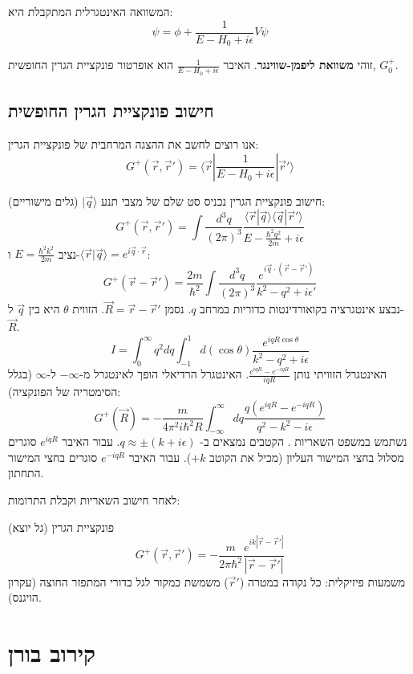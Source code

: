 המשוואה האינטגרלית המתקבלת היא:
$$ \psi = \phi + \frac{1}{E - H_0 + i\epsilon} V \psi $$

זוהי \textbf{משוואת ליפמן-שווינגר}. האיבר $\frac{1}{E - H_0 + i\epsilon}$ הוא אופרטור פונקציית הגרין החופשית, $G_0^+$.

\subsection{חישוב פונקציית הגרין החופשית}
אנו רוצים לחשב את ההצגה המרחבית של פונקציית הגרין:
$$ G^+(\vec{r}, \vec{r}') = \langle \vec{r} | \frac{1}{E - H_0 + i\epsilon} | \vec{r}' \rangle $$

חישוב פונקציית הגרין
נכניס סט שלם של מצבי תנע $|\vec{q}\rangle$ (גלים מישוריים):
$$ G^+(\vec{r}, \vec{r}') = \int \frac{d^3q}{(2\pi)^3} \frac{\langle \vec{r} | \vec{q} \rangle \langle \vec{q} | \vec{r}' \rangle}{E - \frac{\hbar^2 q^2}{2m} + i\epsilon} $$
נציב $E = \frac{\hbar^2 k^2}{2m}$ ו-$\langle \vec{r}|\vec{q}\rangle = e^{i\vec{q}\cdot\vec{r}}$:
$$ G^+(\vec{r} - \vec{r}') = \frac{2m}{\hbar^2} \int \frac{d^3q}{(2\pi)^3} \frac{e^{i\vec{q}\cdot(\vec{r}-\vec{r}')}}{k^2 - q^2 + i\epsilon'} $$
נבצע אינטגרציה בקואורדינטות כדוריות במרחב $q$. נסמן $\vec{R} = \vec{r} - \vec{r}'$. הזווית $\theta$ היא בין $\vec{q}$ ל-$\vec{R}$.
$$ I = \int_0^\infty q^2 dq \int_{-1}^{1} d(\cos\theta) \frac{e^{iqR\cos\theta}}{k^2 - q^2 + i\epsilon} $$
האינטגרל הזוויתי נותן $\frac{e^{iqR} - e^{-iqR}}{iqR}$.
האינטגרל הרדיאלי הופך לאינטגרל מ-$-\infty$ ל-$\infty$ (בגלל הסימטריה של הפונקציה):
$$ G^+(\vec{R}) = -\frac{m}{4\pi^2 i \hbar^2 R} \int_{-\infty}^{\infty} dq \frac{q (e^{iqR} - e^{-iqR})}{q^2 - k^2 - i\epsilon} $$
נשתמש במשפט השאריות . הקטבים נמצאים ב- $q \approx \pm (k + i\epsilon)$.
עבור האיבר $e^{iqR}$ סוגרים מסלול בחצי המישור העליון (מכיל את הקוטב $+k$).
עבור האיבר $e^{-iqR}$ סוגרים בחצי המישור התחתון.

לאחר חישוב השאריות וקבלת התרומות:

\begin{resultbox}{פונקציית הגרין (גל יוצא)}
$$ G^+(\vec{r}, \vec{r}') = -\frac{m}{2\pi \hbar^2} \frac{e^{ik|\vec{r}-\vec{r}'|}}{|\vec{r}-\vec{r}'|} $$
משמעות פיזיקלית: כל נקודה במטרה ($\vec{r}'$) משמשת כמקור לגל כדורי המתפזר החוצה (עקרון הויגנס).
\end{resultbox}

\section{קירוב בורן }

